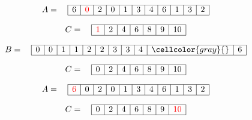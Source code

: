\documentclass{article}
\begin{document}
\begin{center}
\end{center}

\[
A = \quad
\begin{array}{|c|c|c|c|c|c|c|c|c|c|c|}
\hline
6 & \textcolor{red}{0} & 2 & 0 & 1 & 3 & 4 & 6 & 1 & 3 & 2 \\ 
\hline
\end{array}
\]

\[
C = \quad
\begin{array}{|c|c|c|c|c|c|c|}
\hline
\textcolor{red}{1} & 2 & 4 & 6 & 8 & 9 & 10 \\ 
\hline
\end{array}
\]

\[
B = \quad
\begin{array}{|c|c|c|c|c|c|c|c|c|c|c|}
\hline
0 & 0 & 1 & 
1 & 2 & 2 & 
3 & 3 & 4 & 
\cellcolor{gray}{} & 6 \\ 
\hline
\end{array}
\]

\[
C = \quad
\begin{array}{|c|c|c|c|c|c|c|}
\hline
0 & 2 & 4 & 6 & 8 & 9 & 10 \\ 
\hline
\end{array}
\]


\begin{center}
\end{center}

\[
A = \quad
\begin{array}{|c|c|c|c|c|c|c|c|c|c|c|}
\hline
\textcolor{red}{6} & 0 & 2 & 0 & 1 & 3 & 4 & 6 & 1 & 3 & 2 \\ 
\hline
\end{array}
\]

\[
C = \quad
\begin{array}{|c|c|c|c|c|c|c|}
\hline
0 & 2 & 4 & 6 & 8 & 9 & \textcolor{red}{10} \\ 
\hline
\end{array}
\]
\end{document}

